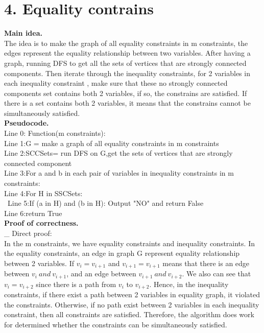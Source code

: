 \documentclass[11pt]{article}
\newcommand{\tab}{\hspace*{2em}}
\begin{document}
\newpage
\section*{4. Equality contrains}
\Large{}
\noindent
\textbf{Main idea.}\\
The idea is to make the graph of all equality constraints in m constraints, the edges represent the equality relationship between two variables. After having a graph, running DFS to get all the sets of vertices that are strongly connected components. Then iterate through the inequality constraints, for 2 variables in each inequality constraint , make sure that these no strongly connected components set contains both 2 variables, if so, the constrains are satisfied. If there is a set contains both 2 variables, it means that the constrains cannot be simultaneously satisfied.\\

\noindent
\large{}
\textbf{Pseudocode.}\\
Line 0: Function(m constraints):\\
Line 1:\tab G = make a graph of all equality constraints in m constraints\\
Line 2:\tab SCCSets= run DFS on G,get the sets of vertices that are strongly connected component\\
Line 3:\tab For a and b in each pair of variables in inequality constraints in m constraints:\\
Line 4:\tab\tab For H in SSCSets:\\\
Line 5:\tab\tab\tab If (a in H) and (b in H): Output "NO" and return False\\
Line 6:\tab return True\\ 
\noindent
\Large{}
\textbf{Proof of correctness.}\\
\_ Direct proof:\\
In the m constraints, we have equality constraints and inequality constraints. In the equality constraints, an edge in graph G represent equality relationship between 2 variables. If $v_i = v_{i+1}$ and $v_{i+1} = v_{i+1}$ means that there is an edge between $v_i\ and\ v_{i+1}$, and an edge between $v_{i+1}\ and\ v_{i+2}$. We also can see that $v_i = v_{i+2}$ since there is a path from $v_i$ to $v_{i+2}$. Hence, in the inequality constraints, if there exist a path between 2 variables in equality graph, it violated the constraints. Otherwise, if no path exist between 2 variables in each inequality constraint, then all constraints are satisfied. Therefore, the algorithm does work for 
determined whether the constraints can be simultaneously satisfied.\\
\end{document}
